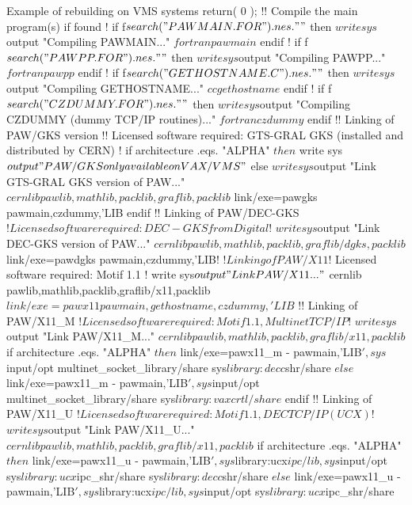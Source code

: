 \begin{XMPt}{Example of rebuilding \PAW{} on VMS systems}
{  return( 0 );
}
$!
$! Compile the main program(s) if found
$!
$  if f$search("PAWMAIN.FOR") .nes. ""
$     then
$     write sys$output "Compiling PAWMAIN..."
$     fortran pawmain
$  endif
$!
$  if f$search("PAWPP.FOR") .nes. ""
$     then
$     write sys$output "Compiling PAWPP..."
$     fortran pawpp
$  endif
$!
$  if f$search("GETHOSTNAME.C") .nes. ""
$     then
$     write sys$output "Compiling GETHOSTNAME..."
$     cc gethostname
$  endif
$!
$  if f$search("CZDUMMY.FOR") .nes. ""
$     then
$     write sys$output "Compiling CZDUMMY (dummy TCP/IP routines)..."
$     fortran czdummy
$  endif
$!
$! Linking of PAW/GKS version
$!
$! Licensed software required: GTS-GRAL GKS (installed and distributed by CERN)
$!
$   if architecture .eqs. "ALPHA"
$      then
$         write sys$output "PAW/GKS only available on VAX/VMS"
$      else
$         write sys$output "Link GTS-GRAL GKS version of PAW..."
$         cernlib pawlib,mathlib,packlib,graflib,packlib
$         link/exe=pawgks pawmain,czdummy,'LIB$
$      endif
$! 
$! Linking of PAW/DEC-GKS
$! Licensed software required: DEC-GKS from Digital
$!
$   write sys$output "Link DEC-GKS version of PAW..."
$   cernlib pawlib,mathlib,packlib,graflib/dgks,packlib
$   link/exe=pawdgks pawmain,czdummy,'LIB$
$!
$! Linking of PAW/X11
$! Licensed software required: Motif 1.1
$!
$   write sys$output "Link PAW/X11..."
$   cernlib pawlib,mathlib,packlib,graflib/x11,packlib
$   link/exe=pawx11 pawmain,gethostname,czdummy,'LIB$
$!
$! Linking of PAW/X11_M
$! Licensed software required: Motif 1.1, Multinet TCP/IP
$!
$   write sys$output "Link PAW/X11_M..."
$   cernlib pawlib,mathlib,packlib,graflib/x11,packlib
$   if architecture .eqs. "ALPHA"
$      then
$         link/exe=pawx11_m -
             pawmain,'LIB$',sys$input/opt
             multinet_socket_library/share
             sys$library:decc$shr/share
$      else
$         link/exe=pawx11_m -
             pawmain,'LIB$',sys$input/opt
             multinet_socket_library/share
             sys$library:vaxcrtl/share
$   endif
$!
$! Linking of PAW/X11_U
$! Licensed software required: Motif 1.1, DEC TCP/IP (UCX)
$!
$   write sys$output "Link PAW/X11_U..."
$   cernlib pawlib,mathlib,packlib,graflib/x11,packlib
$   if architecture .eqs. "ALPHA"
$      then
$         link/exe=pawx11_u -
             pawmain,'LIB$',sys$library:ucx$ipc/lib,sys$input/opt
             sys$library:ucx$ipc_shr/share
             sys$library:decc$shr/share
$      else
$         link/exe=pawx11_u -
             pawmain,'LIB$',sys$library:ucx$ipc/lib,sys$input/opt
             sys$library:ucx$ipc_shr/share

\end{XMPt}
